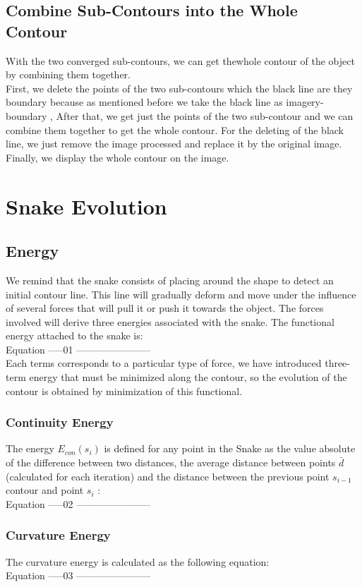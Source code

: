 \subsection{Combine Sub-Contours into the Whole Contour}\label{subsec:combine-sub-contours-into-the-whole-contour}
With the two converged sub-contours, we can get thewhole contour of the object by
combining them together.\\
First, we delete the points of the two sub-contours which the black line are they
boundary because as mentioned before we take the black line as imagery- boundary
, After that, we get just the points of the two sub-contour and we can combine them
together to get the whole contour. For the deleting of the black line, we just remove
the image processed and replace it by the original image. Finally, we display the
whole contour on the image.
\section{Snake Evolution}\label{sec:snake-evolution}
\subsection{Energy}\label{subsec:energy}
We remind that the snake consists of placing around the shape to detect an initial
contour line. This line will gradually deform and move under the influence of several
forces that will pull it or push it towards the object. The forces involved will derive
three energies associated with the snake. The functional energy attached to the
snake is:
\\Equation -----01 -----------------------\\
Each terms corresponds to a particular type of force, we have introduced three-term
energy that must be minimized along the contour, so the evolution of the contour is
obtained by minimization of this functional.
\subsubsection{Continuity Energy}
The energy $E_{con}(s_{i})$ is defined for any point in the Snake as the value absolute of the
difference between two distances, the average distance between points $\bar{d}$
(calculated for each iteration) and the distance between the previous point $s_{i-1}$
contour and point $s_{i}$ :
\\Equation -----02 -----------------------\\
\subsubsection{Curvature Energy}
The curvature energy is calculated as the following equation:
\\Equation -----03 -----------------------\\
